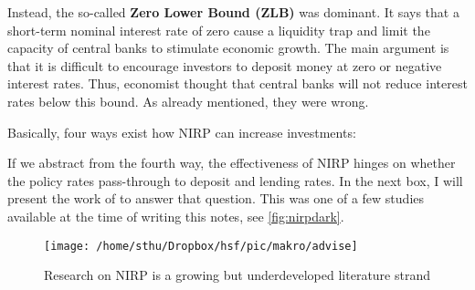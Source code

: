 Instead, the so-called \textbf{Zero Lower Bound (ZLB)} was dominant. It says that a short-term nominal interest rate of zero cause a liquidity trap and limit the capacity of central banks to stimulate economic growth. The main argument is that it is difficult to encourage investors to deposit money at zero or negative interest rates. Thus, economist thought that central banks will not reduce interest rates below this bound. As already mentioned, they were wrong. 



Basically, four ways exist how NIRP can increase investments:
\smallskip

If we abstract from the fourth way, the effectiveness of NIRP hinges on whether the policy rates pass-through to deposit and lending rates. 
In the next box, I will present the work of \cite{Eggertsson2017Are} to answer that question. This was one of a few studies available at the time of writing this notes, see \autoref{fig:nirpdark}.

\begin{figure}
	\begin{center}
		\texttt{[image: /home/sthu/Dropbox/hsf/pic/makro/advise]}
		\label{fig:advise}
	\end{center}
	\caption{Research on NIRP is a growing but underdeveloped literature strand}\label{fig:nirpdark}
\end{figure}


